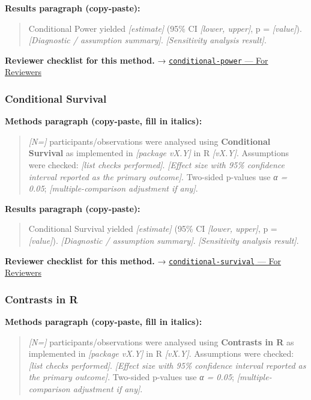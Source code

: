 \documentclass[
]{article}
\begin{document}
\textbf{Results paragraph (copy-paste):}

\begin{quote}
Conditional Power yielded \emph{{[}estimate{]}} (95\% CI \emph{{[}lower,
upper{]}}, p = \emph{{[}value{]}}). \emph{{[}Diagnostic / assumption
summary{]}}. \emph{{[}Sensitivity analysis result{]}}.
\end{quote}

\textbf{Reviewer checklist for this method.} →
\href{../chapters/14-clinical/conditional-power.Rmd\#for-reviewers}{\texttt{conditional-power}
--- For Reviewers}

\subsubsection{Conditional Survival}\label{conditional-survival}

\textbf{Methods paragraph (copy-paste, fill in italics):}

\begin{quote}
\emph{{[}N={]}} participants/observations were analysed using
\textbf{Conditional Survival} as implemented in \emph{{[}package
vX.Y{]}} in R \emph{{[}vX.Y{]}}. Assumptions were checked: \emph{{[}list
checks performed{]}}. \emph{{[}Effect size with 95\% confidence interval
reported as the primary outcome{]}}. Two-sided p-values use \emph{α =
0.05}; \emph{{[}multiple-comparison adjustment if any{]}}.
\end{quote}

\textbf{Results paragraph (copy-paste):}

\begin{quote}
Conditional Survival yielded \emph{{[}estimate{]}} (95\% CI
\emph{{[}lower, upper{]}}, p = \emph{{[}value{]}}). \emph{{[}Diagnostic
/ assumption summary{]}}. \emph{{[}Sensitivity analysis result{]}}.
\end{quote}

\textbf{Reviewer checklist for this method.} →
\href{../chapters/11-survival/conditional-survival.Rmd\#for-reviewers}{\texttt{conditional-survival}
--- For Reviewers}

\subsubsection{Contrasts in R}\label{contrasts-in-r}

\textbf{Methods paragraph (copy-paste, fill in italics):}

\begin{quote}
\emph{{[}N={]}} participants/observations were analysed using
\textbf{Contrasts in R} as implemented in \emph{{[}package vX.Y{]}} in R
\emph{{[}vX.Y{]}}. Assumptions were checked: \emph{{[}list checks
performed{]}}. \emph{{[}Effect size with 95\% confidence interval
reported as the primary outcome{]}}. Two-sided p-values use \emph{α =
0.05}; \emph{{[}multiple-comparison adjustment if any{]}}.
\end{quote}
\end{document}
